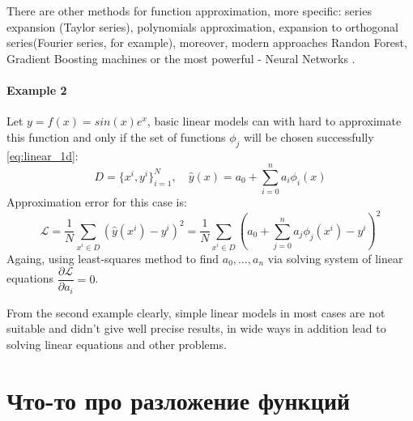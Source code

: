 There are other methods for function approximation, more specific: series expansion (Taylor series), polynomials approximation, expansion to orthogonal series(Fourier series, for example), moreover, modern approaches Randon Forest, Gradient Boosting \cite{bishop} machines or the most powerful - Neural Networks \cite{haykin}.

\paragraph{Example 2}
Let $y = f(x) = sin(x) e^{x}$, basic linear models can with hard to approximate this function and only if the set of functions $\phi_j$ will be chosen successfully \eqref{eq:linear_1d}:
$$
D = \{ x^i, y^i \}_{i = 1}^N, \quad \hat{y}(x) = a_0 + \sum_{i = 0}^n a_i \phi_i(x)
$$
Approximation error for this case is:
\begin{equation}
	\mathcal{L} = \dfrac{1}{N} \sum_{x^i \in D} \left ( \hat{y}(x^i) - y^i \right )^2 = \dfrac{1}{N} \sum_{x^i \in D} \left ( a_0 + \sum_{j = 0}^n a_j \phi_j(x^i) - y^i \right )^2
\end{equation}
Againg, using least-squares method to find $a_0, \dots, a_n$ via solving system of linear equations $\dfrac{\partial \mathcal{L}}{\partial a_i} = 0$.

From the second example clearly, simple linear models in most cases are not suitable and didn't give well precise results, in wide ways in addition lead to solving linear equations and other problems.

\section{Что-то про разложение функций}

